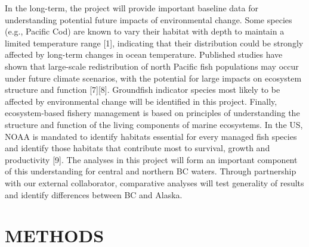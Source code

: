 \documentclass[11pt]{book}\usepackage[]{graphicx}\usepackage[]{color}
\begin{document}
In the long-term, the project will provide important baseline data for understanding potential future impacts of environmental change. Some species (e.g., Pacific Cod) are known to vary their habitat with depth to maintain a limited temperature range [1], indicating that their distribution could be strongly affected by long-term changes in ocean temperature. Published studies have shown that large-scale redistribution of north Pacific fish populations may occur under future climate scenarios, with the potential for large impacts on ecosystem structure and function [7][8]. Groundfish indicator species most likely to be affected by environmental change will be identified in this project.  Finally, ecosystem-based fishery management is based on principles of understanding the structure and function of the living components of marine ecosystems. In the US, NOAA is mandated to identify habitats essential for every managed fish species and identify those habitats that contribute most to survival, growth and productivity [9]. The analyses in this project will form an important component of this understanding for central and northern BC waters. Through partnership with our external collaborator, comparative analyses will test generality of results and identify differences between BC and Alaska.

\bigskip

\section{METHODS} 
\end{document}
